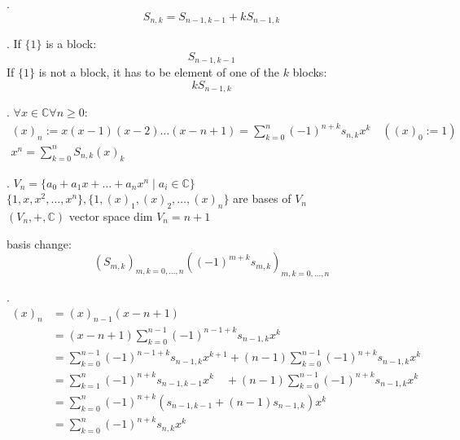 \Theorem.
\[
  S_{n,k} = S_{n-1,k-1} + k S_{n-1,k}
\]

\Proof.
If $\{1\}$ is a block:
\[
  S_{n-1,k-1}
\]
If $\{1\}$ is not a block, it has to be element of one of the $k$ blocks:
\[
  k S_{n-1,k}
\]

\Theorem.
$\forall x\in \mathbb{C} \forall n ≥ 0:$
\begin{gather*}
  (x)_n
    := x(x-1)(x-2) \ldots(x-n+1)
    = \sum_{k=0}^{n} (-1)^{n+k} s_{n,k} x^k \quad ((x)_0:=1)
    \\
  x^n = \sum_{k=0}^{n} S_{n,k} (x)_k
\end{gather*}

\Remark.
$V_n = \{a_0 + a_1 x + \ldots + a_n x^n \mid a_i \in \mathbb{C} \}$ \\
$\{1,x,x^2, \ldots , x^n\}, \{1,(x)_1, (x)_2, \ldots ,(x)_n\}$ are bases of $V_n$ \\
$(V_n, +, \mathbb{C})$ vector space dim $V_n = n+1$

basis change:
\[
  (S_{m,k})_{m,k= 0, \ldots,n}
    ((-1)^{m+k} s_{m,k})_{m,k= 0, \ldots,n}
\]

\Proof.
\begin{align*}
  (x)_n
  &= (x)_{n-1} (x-n+1) \\
  &= (x-n+1) \sum_{k=0}^{n-1} (-1)^{n-1+k} s_{n-1,k} x^k \\
  &= \sum_{k=0}^{n-1} (-1)^{n-1+k} s_{n-1,k} x^{k+1}
    + (n-1)\sum_{k=0}^{n-1} (-1)^{n+k} s_{n-1,k} x^k \\
  &= \sum_{k=1}^n (-1)^{n+k} s_{n-1,k-1} x^k
    \quad + (n-1)\sum_{k=0}^{n-1} (-1)^{n+k} s_{n-1,k} x^k \\
  &= \sum_{k=0}^n (-1)^{n+k}
    (s_{n-1,k-1} + (n-1)s_{n-1,k}) x^k \\
  &= \sum_{k=0}^n (-1)^{n+k} s_{n,k} x^k \\
\end{align*}

